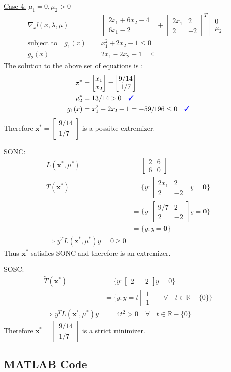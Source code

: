 \documentclass[a4paper,11pt]{article}
\newcommand{\V}[1]{\pmb{#1}}
\newcommand{\mat}[1]{\begin{bmatrix}#1\end{bmatrix}}
\newcommand{\cmark}{{\color{blue}\text{\ding{51}}}}%
\begin{document}
\noindent\underline{Case 4:} $\mu_1=0, \mu_2>0$
\begin{align*}
 \nabla_x l(x,\lambda,\mu) &= \mat{2x_1 +6x_2 -4\\ 6x_1 -2} +
\mat{2x_1 & 2\\ 2&  -2}^T\mat{0\\ \mu_2}\\
% 
 \text{subject to}\quad g_1(x)&=x_1^2 +2x_2-1 \leq 0\\
 g_2(x)&=2x_1-2x_2-1= 0
\end{align*}
The solution to the above set of equations is :
\begin{align*}
 \V{x}^*&=\mat{x_1\\x_2} = \mat{9/14\\1/7}\\
 \mu_2^*&=13/14 >0 \quad \cmark\\
 g_1(x)&=x_1^2 +2x_2-1 = -59/196\leq 0 \quad \cmark\\
\end{align*}
Therefore $\V{x}^*=\mat{9/14\\1/7}$ is a possible extremizer. 

\noindent SONC: 
\begin{align*}
 L(\V{x}^*,\mu^*) &= \mat{2&6\\6&0}\\
 T(\V{x}^*) &=\{y: \mat{2x_1& 2\\2& -2}y = \V{0}\}\\
 &=\{y: \mat{9/7& 2\\2& -2}y = \V{0}\}\\
 &= \{y: y=\V{0}\}\\
 \Rightarrow y^TL(\V{x}^*,\mu^*)y = 0 \geq 0
\end{align*}
Thus $\V{x}^*$ satisfies SONC and therefore is an extremizer. 

\noindent SOSC:
\begin{align*}
 \tilde{T}(\V{x}^*) &= \{y:\mat{2&-2}y = 0\}\\
 &= \{y:y=t\mat{1\\1} \quad \forall \quad t\in \mathbb{R} -\{0\}\}\\
 \Rightarrow y^TL(\V{x}^*,\mu^*)y &= 14t^2>0 \quad \forall \quad t\in \mathbb{R} -\{0\}
\end{align*}
Therefore $\V{x}^*=\mat{9/14\\1/7}$ is a strict minimizer.




\newpage
\subsection*{MATLAB Code}
%
\end{document}
